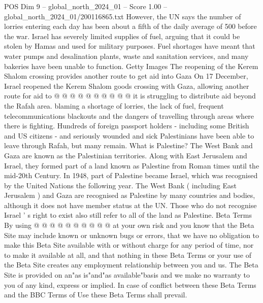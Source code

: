 \begin{textsample}{POS Dim 9 – global\_north\_2024\_01 – Score 1.00 – global\_north\_2024\_01/200116865.txt}
However, the UN says the number of lorries entering each day has been about a fifth of the daily average of 500 before the war.
Israel has severely limited supplies of fuel, arguing that it could be stolen by Hamas and used for military purposes.
Fuel shortages have meant that water pumps and desalination plants, waste and sanitation services, and many bakeries have been unable to function.
Getty Images The reopening of the Kerem Shalom crossing provides another route to get aid into Gaza On 17 December, Israel reopened the Kerem Shalom goods crossing with Gaza, allowing another route for aid to @ @ @ @ @ @ @ @ @ @ it is struggling to distribute aid beyond the Rafah area. blaming a shortage of lorries, the lack of fuel, frequent telecommunications blackouts and the dangers of travelling through areas where there is fighting.
Hundreds of foreign passport holders - including some British and US citizens - and seriously wounded and sick Palestinians have been able to leave through Rafah, but many remain.
What is Palestine?
The West Bank and Gaza are known as the Palestinian territories.
Along with East Jerusalem and Israel, they formed part of a land known as Palestine from Roman times until the mid-20th Century.
In 1948, part of Palestine became Israel, which was recognised by the United Nations the following year.
The West Bank ( including East Jerusalem ) and Gaza are recognised as Palestine by many countries and bodies, although it does not have member status at the UN.
Those who do not recognise Israel ' s right to exist also still refer to all of the land as Palestine.
Beta Terms By using @ @ @ @ @ @ @ @ @ @ at your own risk and you know that the Beta Site may include known or unknown bugs or errors, that we have no obligation to make this Beta Site available with or without charge for any period of time, nor to make it available at all, and that nothing in these Beta Terms or your use of the Beta Site creates any employment relationship between you and us.
The Beta Site is provided on an"as is"and"as available"basis and we make no warranty to you of any kind, express or implied.
In case of conflict between these Beta Terms and the BBC Terms of Use these Beta Terms shall prevail.

\end{textsample}
